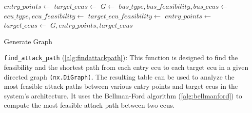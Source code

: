 \begin{algorithm}[h]
    \label{alg:generate_graph}
    \begin{algorithmic}[1]
        \State $entry\_points \gets$ 
        \State $target\_ecus \gets$ 
        \State $G \gets$ 
            \State $bus\_type, bus\_feasibility, bus\_ecus \gets$ 
                \State $ecu\_type, ecu\_feasibility \gets$ 
                    \State {}
                \EndIf
                    \State {}
                \EndIf
                        \State {}
                    \Else
                        \State $target\_ecu\_feasibility \gets$ 
                        \State {}
                    \EndIf
                \EndFor
            \EndFor
        \EndFor
        \State $entry\_points \gets$ 
        \State $target\_ecus \gets$ 
        \State \Return $G, entry\_points, target\_ecus$
    \EndProcedure
    \caption{Generate Graph}
    \end{algorithmic}
\end{algorithm}

\newpage

\texttt{find\_attack\_path} (\ref{alg:findattackpath}): 
This function is designed to find the feasibility and the shortest path from each entry \acrshort{ecu} 
to each target \acrshort{ecu} in a given directed graph \texttt{(nx.DiGraph)}.
The resulting table can be used to analyze the most feasible attack paths between 
various entry points and target \acrshort{ecu}s in the system's architecture.
It uses the Bellman-Ford algorithm (\ref{alg:bellmanford}) to compute the most feasible attack path between two \acrshort{ecu}s.\\

